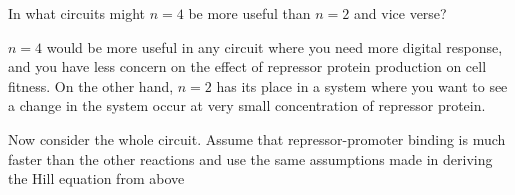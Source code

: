 \documentclass[11pt]{article}
\begin{document}
\begin{itemize}
{
}

In what circuits might $n=4$ be more useful than $n=2$ and vice verse?

$n=4$ would be more useful in any circuit where you need more digital response, and you have less concern on the effect of repressor protein production on cell fitness.
On the other hand, $n=2$ has its place in a system where you want to see a change in the system occur at very small concentration of repressor protein. 
\end{itemize}

Now consider the whole circuit. Assume that repressor-promoter binding is much faster than the other reactions and use the same assumptions made in deriving the Hill equation from above
\end{document}
